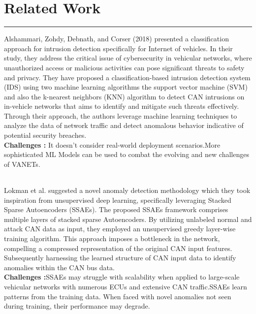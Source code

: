 \chapter{Related Work}
\hrule
\vspace{.5cm}


Alshammari, Zohdy, Debnath, and Corser (2018) \cite{alshammari2018classification} presented a classification approach for intrusion detection specifically for Internet of vehicles. In their study, they address the critical issue of cybersecurity in vehicular networks, where unauthorized access or malicious activities can pose significant threats to safety and privacy. 
They have proposed a classification-based intrusion detection system (IDS) using two machine learning algorithms the support vector machine (SVM) and also the k-nearest neighbors (KNN) algorithm to detect CAN intrusions on in-vehicle networks that aims to identify and mitigate such threats effectively. Through their approach, the authors leverage machine learning techniques to analyze the data of network traffic and detect anomalous behavior indicative of potential security breaches.
   \\
   \textbf{Challenges : } It doesn't consider real-world deployment scenarios.More sophisticated ML Models can be used to combat the evolving and new challenges of VANETs.
    \\
    \\
    \pagebreak
   \par Lokman et al. \cite{lokman2018stacked}
suggested a novel anomaly detection methodology which they took inspiration from unsupervised deep learning, specifically leveraging Stacked Sparse Autoencoders (SSAEs). The proposed SSAEs framework comprises multiple layers of stacked sparse Autoencoders. By utilizing unlabeled normal and attack CAN data as input, they employed an unsupervised greedy layer-wise training algorithm. This approach imposes a bottleneck in the network, compelling a compressed representation of the original CAN input features. Subsequently harnessing the learned structure of CAN input data to identify anomalies within the CAN bus data.
\\
\textbf{Challenges :}SSAEs may struggle with scalability when applied to large-scale vehicular networks with numerous ECUs and extensive CAN traffic.SSAEs learn patterns from the training data. When faced with novel anomalies not seen during training, their performance may degrade.
\\
\\

   
   




